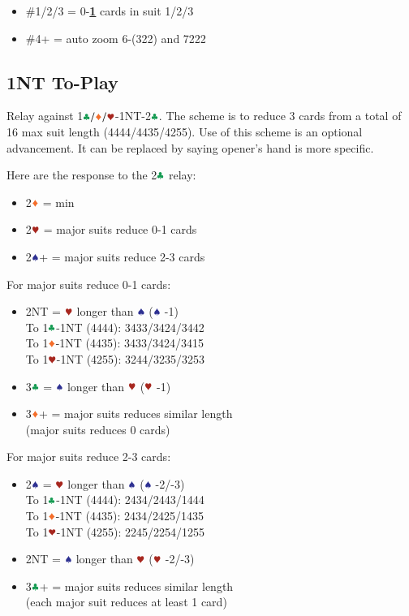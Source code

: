 \documentclass{article}
\begin{document}
\begin{multicols}{2}
\begin{CJK*}{UTF8}{gt}
\begin{itemize}
    \item \#1/2/3 = 0-\textbf{\underline{1}} cards in suit 1/2/3
    \item \#4+ = auto zoom 6-(322) and 7222
\end{itemize}

\subsection{1NT To-Play}\label{sec:1nt-to-play}
Relay against 1$\ccc/\ddd/\hhh$-1NT-2$\ccc$. The scheme is to reduce 3 cards from a total of 16 max suit length (4444/4435/4255). Use of this scheme is an optional advancement. It can be replaced by saying opener's hand is more specific.

\columnbreak

\noindent Here are the response to the 2$\ccc$ relay:
\begin{itemize}
    \item 2$\ddd$ = min
    \item 2$\hhh$ = major suits reduce 0-1 cards
    \item 2$\sss$+ = major suits reduce 2-3 cards
\end{itemize}
\vspace{1em}

\noindent For major suits reduce 0-1 cards:
\begin{itemize}
    \item 2NT = $\hhh$ longer than $\sss$ ($\sss$ -1) \\
        To 1$\ccc$-1NT (4444): 3433/3424/3442 \\
        To 1$\ddd$-1NT (4435): 3433/3424/3415 \\
        To 1$\hhh$-1NT (4255): 3244/3235/3253
    \item 3$\ccc$ = $\sss$ longer than $\hhh$ ($\hhh$ -1)
    \item 3$\ddd$+ = major suits reduces similar length \\
        (major suits reduces 0 cards)
\end{itemize}
\vspace{1em}

\noindent For major suits reduce 2-3 cards:
\begin{itemize}
    \item 2$\sss$ = $\hhh$ longer than $\sss$ ($\sss$ -2/-3) \\
        To 1$\ccc$-1NT (4444): 2434/2443/1444 \\
        To 1$\ddd$-1NT (4435): 2434/2425/1435 \\
        To 1$\hhh$-1NT (4255): 2245/2254/1255
    \item 2NT = $\sss$ longer than $\hhh$ ($\hhh$ -2/-3)
    \item 3$\ccc$+ = major suits reduces similar length \\
        (each major suit reduces at least 1 card)
\end{itemize}


\end{CJK*}
\end{multicols}
\end{document}
